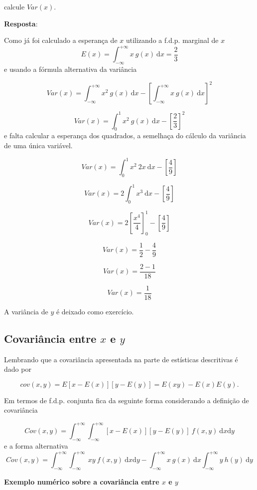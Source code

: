 \documentclass[
]{book}
\begin{document}
calcule \(Var(x)\).

\textbf{Resposta}:

Como já foi calculado a esperança de \(x\) utilizando a f.d.p. marginal de \(x\)
\[
  E(x) = \int_{-\infty}^{+\infty} x~g(x)~\text{d}x = \dfrac{2}{3}
\]
e usando a fórmula alternativa da variância

\[
  Var(x) = \int_{-\infty}^{+\infty} x^2~g(x)~\text{d}x - \left[ \int_{-\infty}^{+\infty}x~g(x)~\text{d}x \right]^2
\]

\[
  Var(x) = \int_{0}^{1} x^2~g(x)~\text{d}x - \left[ \dfrac{2}{3}\right]^2
\]
e falta calcular a esperança dos quadrados, a semelhaça do cálculo da variância de uma única variável.

\[
  Var(x) = \int_{0}^{1} x^2~2x~\text{d}x - \left[ \dfrac{4}{9}\right]
\]

\[
  Var(x) = 2\int_{0}^{1} x^3~\text{d}x - \left[ \dfrac{4}{9}\right]
\]

\[
  Var(x) = 2\left[ \dfrac{x^4}{4} \right]_{0}^{1} - \left[ \dfrac{4}{9}\right]
\]

\[
  Var(x) = \dfrac{1}{2} - \dfrac{4}{9}
\]

\[
  Var(x) = \dfrac{2-1}{18}
\]

\[
  Var(x) = \dfrac{1}{18}
\]

A variância de \(y\) é deixado como exercício.

\hypertarget{covariuxe2ncia-entre-x-e-y}{%
\subsection{\texorpdfstring{Covariância entre \(x\) e \(y\)}{Covariância entre x e y}}\label{covariuxe2ncia-entre-x-e-y}}

Lembrando que a covariância apresentada na parte de estísticas descritivas é dado por

\[
  cov(x,y) = E[x - E(x)][y - E(y)] = E(xy) - E(x)E(y).
\]

Em termos de f.d.p. conjunta fica da seguinte forma considerando a definição de covariância

\[
  Cov(x,y) = \int_{-\infty}^{+\infty}\int_{-\infty}^{+\infty}[x - E(x)][y - E(y)]~f(x,y)~\text{d}x\text{d}y 
\]
e a forma alternativa
\[
  Cov(x,y) = \int_{-\infty}^{+\infty}\int_{-\infty}^{+\infty}~xy~f(x,y)~\text{d}x\text{d}y - \int_{-\infty}^{+\infty}x~g(x)~\text{d}x \int_{-\infty}^{+\infty}y~h(y)~\text{d}y
\]

\textbf{Exemplo numérico sobre a covariância entre \(x\) e \(y\)}
\end{document}
